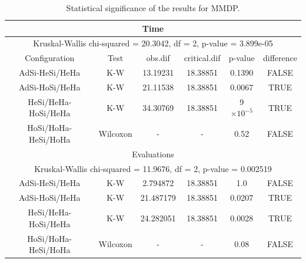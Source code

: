 \documentclass[final,1p,times]{elsarticle}
\providecommand{\e}[1]{\ensuremath{\times 10^{#1}}}
\begin{document}
\begin{table}
\centering
\caption{Statistical significance of the results for MMDP.}
\begin{tabular}{|c|c|c|c|c|c|} \hline
\multicolumn{6}{|c|}{Time} \\ \hline
\multicolumn{6}{|c|}{Kruskal-Wallis chi-squared = 20.3042, df = 2, p-value = 3.899e-05} \\ \hline
Configuration       & Test  & obs.dif   & critical.dif  & p-value & difference \\ \hline
AdSi-HeSi/HeHa      & K-W   & 13.19231  &    18.38851   & 0.1390  &  FALSE \\ \hline
AdSi-HoSi/HeHa      & K-W   & 21.11538  &    18.38851   & 0.0067  & TRUE \\ \hline
HeSi/HeHa-HoSi/HeHa & K-W   & 34.30769  &    18.38851   & 9\e{-5} & TRUE \\ \hline \hline
HoSi/HoHa-HeSi/HoHa & Wilcoxon & -      & -             & 0.52    & FALSE \\ \hline \hline


\multicolumn{6}{|c|}{Evaluations}  \\ \hline
\multicolumn{6}{|c|}{Kruskal-Wallis chi-squared = 11.9676, df = 2, p-value = 0.002519} \\ \hline
AdSi-HeSi/HeHa      & K-W  & 2.794872   & 18.38851      &  1.0          & FALSE \\ \hline
AdSi-HoSi/HeHa      & K-W  & 21.487179  & 18.38851      &  0.0207        & TRUE\\ \hline
HeSi/HeHa-HoSi/HeHa & K-W  & 24.282051  & 18.38851      &  0.0028        & TRUE \\ \hline \hline
HoSi/HoHa-HeSi/HoHa &Wilcoxon & -       & -             & 0.08           & FALSE \\ \hline 

\end{tabular}
\label{tab:significanceMMDP}
\end{table}
\end{document}
